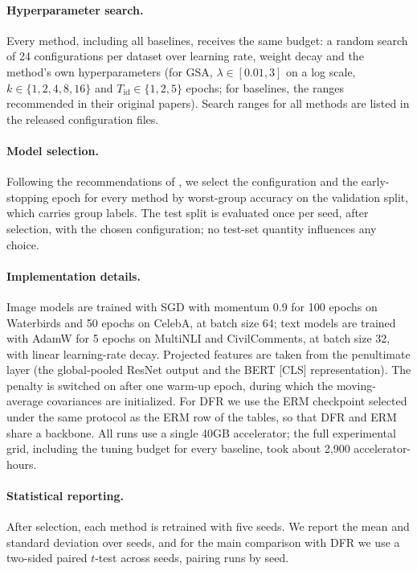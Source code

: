 \documentclass{article}
\begin{document}
\paragraph{Hyperparameter search.}
Every method, including all baselines, receives the same budget: a random search of 24 configurations per dataset over learning rate, weight decay and the method's own hyperparameters (for GSA, $\lambda \in [0.01, 3]$ on a log scale, $k \in \{1, 2, 4, 8, 16\}$ and $T_{\mathrm{id}} \in \{1, 2, 5\}$ epochs; for baselines, the ranges recommended in their original papers). Search ranges for all methods are listed in the released configuration files.

\paragraph{Model selection.}
Following the recommendations of \citet{gulrajani2021search}, we select the configuration and the early-stopping epoch for every method by worst-group accuracy on the validation split, which carries group labels. The test split is evaluated once per seed, after selection, with the chosen configuration; no test-set quantity influences any choice.

\paragraph{Implementation details.}
Image models are trained with SGD with momentum 0.9 for 100 epochs on Waterbirds and 50 epochs on CelebA, at batch size 64; text models are trained with AdamW for 5 epochs on MultiNLI and CivilComments, at batch size 32, with linear learning-rate decay. Projected features are taken from the penultimate layer (the global-pooled ResNet output and the BERT [CLS] representation). The penalty is switched on after one warm-up epoch, during which the moving-average covariances are initialized. For DFR we use the ERM checkpoint selected under the same protocol as the ERM row of the tables, so that DFR and ERM share a backbone. All runs use a single 40GB accelerator; the full experimental grid, including the tuning budget for every baseline, took about 2,900 accelerator-hours.

\paragraph{Statistical reporting.}
After selection, each method is retrained with five seeds. We report the mean and standard deviation over seeds, and for the main comparison with DFR we use a two-sided paired $t$-test across seeds, pairing runs by seed.
\end{document}
